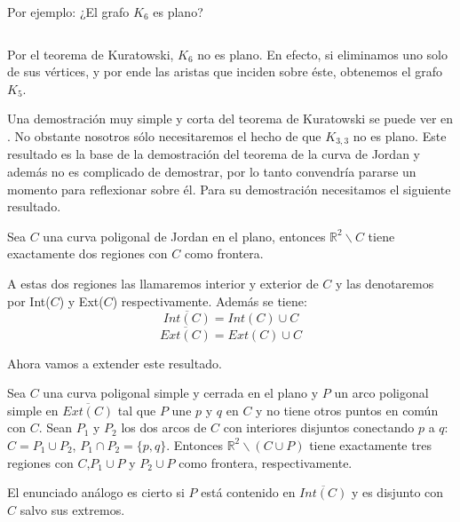 \documentclass[12pt,a4paper,oldfontcommands]{memoir}
\begin{document}
Por ejemplo: ¿El grafo $K_6$ es plano?
\[\]
\[\]
	
	Por el teorema de Kuratowski, $K_{6}$ no es plano. En efecto, si eliminamos uno solo de sus vértices, y por ende las aristas que inciden sobre éste, obtenemos el grafo $K_5$.
	
	Una demostración muy simple y corta del teorema de Kuratowski se puede ver en \cite{Kuratowski}. No obstante nosotros sólo necesitaremos el hecho de que $K_{3,3}$ no es plano.
	Este resultado es la base de la demostración del teorema de la curva de Jordan y además no es complicado de demostrar, por lo tanto convendría pararse un momento para reflexionar sobre él. Para su demostración necesitamos el siguiente resultado.
	
\begin{lemma}
	Sea $C$ una curva poligonal de Jordan en el plano, entonces $\mathbb{R}^2 \backslash C$ tiene exactamente dos regiones con $C$ como frontera.
\end{lemma}

	A estas dos regiones las llamaremos interior y exterior de $C$ y las denotaremos por Int($C$) y Ext($C$) respectivamente. Además se tiene:
\[
\overline{Int(C)} = Int(C) \cup C
\]
\[
\overline{Ext(C)} = Ext(C) \cup C
\]

Ahora vamos a extender este resultado.

\begin{lemma}\label{lema24}
	Sea $C$ una curva poligonal simple y cerrada en el plano y $P$ un arco poligonal simple en $\overline{Ext(C)}$ tal que $P$ une $p$ y $q$ en $C$ y no tiene otros puntos en común con $C$. Sean $P_1$ y $P_2$ los dos arcos de $C$ con interiores disjuntos conectando $p$ a $q$: $C=P_1\cup P_2$, $P_1\cap P_2=\{p,q\}$. Entonces $\mathbb{R}^2 \backslash (C \cup P)$ tiene exactamente tres regiones con $C$,$P_{1} \cup P$ y $P_{2} \cup P$ como frontera, respectivamente.
	
El enunciado análogo es cierto si $P$ está contenido en  $\overline{Int(C)}$ y es disjunto con $C$ salvo sus extremos.
\end{lemma}
\end{document}
